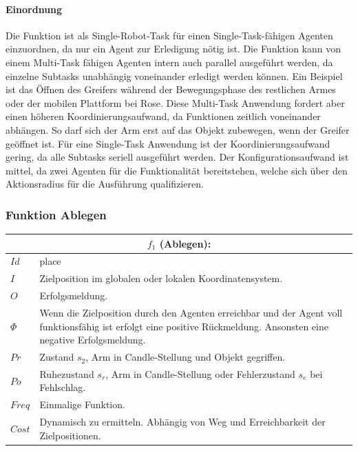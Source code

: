 \paragraph{Einordnung}
Die Funktion ist als Single-Robot-Task für einen Single-Task-fähigen Agenten einzuordnen, da nur ein Agent zur Erledigung nötig ist. Die Funktion kann von einem Multi-Task fähigen Agenten intern auch parallel ausgeführt werden, da einzelne Subtasks unabhängig voneinander erledigt werden können. Ein Beispiel ist das Öffnen des Greifers während der Bewegungsphase des restlichen Armes oder der mobilen Plattform bei Rose. Diese Multi-Task Anwendung fordert aber einen höheren Koordinierungsaufwand, da Funktionen zeitlich voneinander abhängen. So darf sich der Arm erst auf das Objekt zubewegen, wenn der Greifer geöffnet ist. Für eine Single-Task Anwendung ist der Koordinierungsaufwand gering, da alle Subtasks seriell ausgeführt werden. Der Konfigurationsaufwand ist mittel, da zwei Agenten für die Funktionalität bereitstehen, welche sich über den Aktionsradius für die Ausführung qualifizieren. 

\subsubsection{Funktion Ablegen}

\begin{tabular}{|p{3cm}|p{10cm}|}
	\multicolumn{2}{c}{$f_1$ (Ablegen):}\\
	\hline  $Id$ & place\\ 
	\hline  $I$ & Zielposition im globalen oder lokalen Koordinatensystem. \\ 
	\hline  $O$ & Erfolgsmeldung. \\ 
	\hline  $\Phi$ & Wenn die Zielposition durch den Agenten erreichbar und der Agent voll funktionsfähig ist erfolgt eine positive Rückmeldung. Ansonsten eine negative Erfolgsmeldung.\\ 
	\hline $Pr$ & Zustand $s_2$, Arm in Candle-Stellung und Objekt gegriffen. \\ 
	\hline $Po$ & Ruhezustand $s_r$, Arm in Candle-Stellung oder Fehlerzustand $s_e$ bei Fehlschlag. \\ 
	\hline $Freq$ & Einmalige Funktion.\\ 
	\hline $Cost$ & Dynamisch zu ermitteln. Abhängig von Weg und Erreichbarkeit der Zielpositionen. \\
	\hline
\end{tabular}


